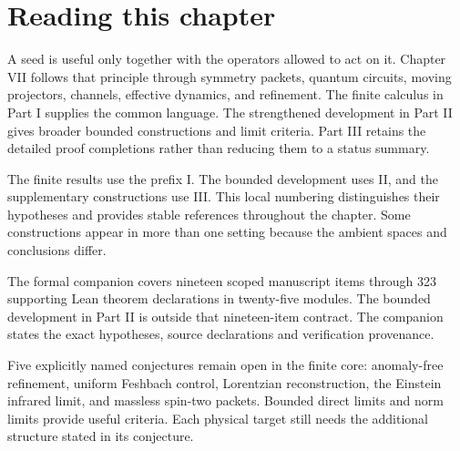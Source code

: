 \documentclass[11pt,letterpaper]{article}
\theoremstyle{definition}
\theoremstyle{remark}
\begin{document}
\KomorebiCover
\begingroup
\setlength{\parskip}{3pt plus .5pt minus .5pt}

\section*{Reading this chapter}
A seed is useful only together with the operators allowed to act on it. Chapter VII follows that principle through symmetry packets, quantum circuits, moving projectors, channels, effective dynamics, and refinement. The finite calculus in Part I supplies the common language. The strengthened development in Part II gives broader bounded constructions and limit criteria. Part III retains the detailed proof completions rather than reducing them to a status summary.

The finite results use the prefix I. The bounded development uses II, and the supplementary constructions use III. This local numbering distinguishes their hypotheses and provides stable references throughout the chapter. Some constructions appear in more than one setting because the ambient spaces and conclusions differ.

The formal companion covers nineteen scoped manuscript items through 323 supporting Lean theorem declarations in twenty-five modules. The bounded development in Part II is outside that nineteen-item contract. The companion states the exact hypotheses, source declarations and verification provenance.

Five explicitly named conjectures remain open in the finite core: anomaly-free refinement, uniform Feshbach control, Lorentzian reconstruction, the Einstein infrared limit, and massless spin-two packets. Bounded direct limits and norm limits provide useful criteria. Each physical target still needs the additional structure stated in its conjecture.
\end{document}
